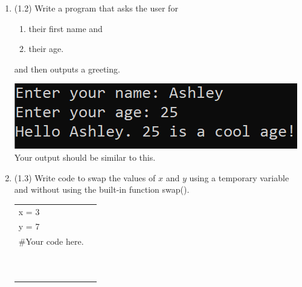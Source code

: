 \documentclass{article}
\begin{document}
\begin{enumerate}
\item (1.2) Write a program that asks the user for \\
		\begin{minipage}{0.5\textwidth}
		\vspace*{-0.5em}
			\begin{enumerate}  \setlength\itemsep{-0.3em}
				\item their first name and
				\item their age.  
			\end{enumerate} \vspace*{-1ex}
		and then outputs a greeting.
		\end{minipage}
		\begin{minipage}{0.5\textwidth}
			\centering
			\includegraphics[scale=0.95]{./imgs/outputGreetingWithAge.png}\\
			Your output should be similar to this.
		\end{minipage}




\item (1.3) 
		Write code to swap the values of $x$ and $y$ using a temporary variable and without using
		the built-in function swap().\\		
		\begin{tabular}{|ll}
			\\			
			x = 3\\
			y = 7\\[5pt]
			\#Your code here. \\[5pt]
			& \\ & \\ & \\ & \\ & \\ & \\ & \\ & \\ & \\ & \\ 
		\end{tabular}




\end{enumerate}
\end{document}
